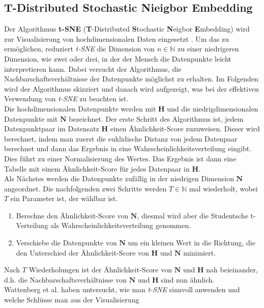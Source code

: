 \documentclass[12pt,letterpaper,ngerman]{article}
\begin{document}
\subsection{ T-Distributed Stochastic Nieigbor Embedding}
Der Algorithmus {\bf  t-SNE}
({\bf T}-Distributed {\bf S}tochastic {\bf N}eigbor {\bf E}mbedding)
wird zur Visualisierung von 
hochdimensionalen Daten eingesetzt
\cite{JMLR:v9:vandermaaten08a}. Um das zu ermöglichen,
reduziert  \textit{t-SNE} die Dimension von $n \in \mathbb{N}$ zu
einer niedrigeren Dimension, wie zwei oder drei, in der der 
Mensch die Datenpunkte leicht interpretieren kann. Dabei versucht
der Algorithmus, die Nachbarschaftsverhältnisse der Datenpunkte
möglichst zu erhalten.
Im Folgenden wird der Algorithmus skizziert und danach wird
aufgezeigt,
was bei der effektiven Verwendung von \textit{t-SNE} zu beachten ist.\\
Die
hochdimensionalen Datenpunkte werden mit $\mathbf{H}$ und die 
niedrigdimensionalen Datenpunkte mit $\mathbf{N}$ bezeichnet.
Der erste Schritt 
des Algorithmus ist, jedem Datenpunktpaar im Datensatz $\mathbf{H}$
einen Ähnlichkeit-Score zuzuweisen. Dieser wird berechnet, indem man 
zuerst die euklidische Distanz von jedem Datenpaar berechnet und dann das 
Ergebnis in eine Wahrscheinlichkeitsverteilung eingibt. Dies führt zu
einer Normalisierung des Wertes. Das Ergebnis ist dann eine Tabelle mit 
einem Ähnlichkeit-Score für jedes Datenpaar in $\mathbf{H}$.\\
Als Nächstes werden die Datenpunkte zufällig in der niedrigen Dimension 
$\mathbf{N}$ angeordnet. Die nachfolgenden zwei Schritte werden 
$T\in \mathbb{N}$ 
mal wiederholt, wobei $T$ ein Parameter ist, der wählbar ist.
\begin{enumerate}
  \item Berechne den Ähnlichkeit-Score von $\mathbf{N}$, diesmal wird aber die
      Studentsche t-Verteilung als Wahrscheinlichkeitsverteilung genommen. 
  \item Verschiebe die Datenpunkte von $\mathbf{N}$ um ein kleinen Wert in
    die Richtung, die den Unterschied der Ähnlichkeit-Score von $\mathbf{H}$
    und $\mathbf{N}$ minimiert.
\end{enumerate}
Nach $T$ Wiederholungen ist der Ähnlichkeit-Score von $\mathbf{N}$ und 
$\mathbf{H}$ nah beieinander, d.h. die Nachbarschaftsverhältnisse 
von $\mathbf{N}$ und $\mathbf{H}$ sind nun ähnlich.\\
Wattenberg et al. haben untersucht, wie man  \textit{t-SNE} sinnvoll
anwenden und welche Schlüsse man aus der Visualisierung 
\end{document}

